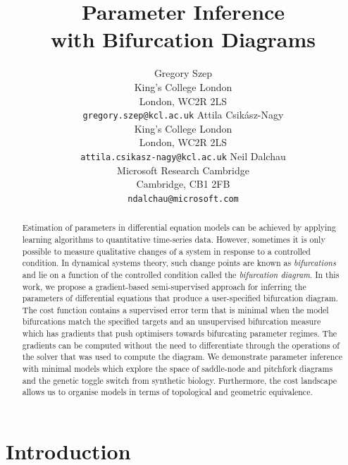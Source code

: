 \documentclass{article}
\title{Parameter Inference\\with Bifurcation Diagrams}
\author{
        Gregory Szep\\King's College London\\London, WC2R 2LS\\
        \texttt{gregory.szep@kcl.ac.uk}
    \And
        Attila Csik\'asz-Nagy\\King's College London\\London, WC2R 2LS\\
        \texttt{attila.csikasz-nagy@kcl.ac.uk}
    \And
        Neil Dalchau\\Microsoft Research Cambridge\\Cambridge, CB1 2FB\\
        \texttt{ndalchau@microsoft.com}
}
\begin{document}
\newcommand{\rates}{F_{\theta}}
\newcommand{\tangent}{T_{\theta}}
\newcommand{\steadystates}{\partial S_{\theta}}

\newcommand{\Det}{\left| \frac{\partial\rates}{\partial u} \right|}
\newcommand{\measure}{\varphi_{\theta}}

\newcommand{\predictions}{\mathcal{P}}
\newcommand{\targets}{\mathcal{D}}
\newcommand{\loss}{L}
\newcommand{\error}{E}
\newcommand{\Reals}{\mathbb{R}}

\maketitle
\begin{abstract}
    Estimation of parameters in differential equation models can be achieved by applying learning algorithms to quantitative time-series data. However, sometimes it is only possible to measure qualitative changes of a system in response to a controlled condition. In dynamical systems theory, such change points are known as \textit{bifurcations} and lie on a function of the controlled condition called the \textit{bifurcation diagram}. In this work, we propose a gradient-based semi-supervised approach for inferring the parameters of differential equations that produce a user-specified bifurcation diagram. The cost function contains a supervised error term that is minimal when the model bifurcations match the specified targets and an unsupervised bifurcation measure which has gradients that push optimisers towards bifurcating parameter regimes. The gradients can be computed without the need to differentiate through the operations of the solver that was used to compute the diagram. We demonstrate parameter inference with minimal models which explore the space of saddle-node and pitchfork diagrams and the genetic toggle switch from synthetic biology. Furthermore, the cost landscape allows us to organise models in terms of topological and geometric equivalence.
\end{abstract}

\section{Introduction}
\label{section:introduction}
\end{document}
